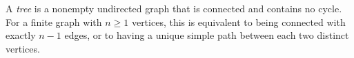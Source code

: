 
A \emph{tree} is a nonempty undirected graph that is connected and contains no cycle. For a finite graph with $n\ge1$ vertices, this is equivalent to being connected with exactly $n-1$ edges, or to having a unique simple path between each two distinct vertices.
